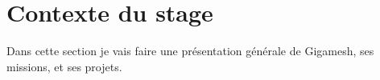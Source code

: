 
\chapter{Contexte du stage} %

\label{Chaptre1} %

Dans cette section je vais faire une présentation générale de Gigamesh, ses missions, et ses projets.


\newcommand{\keyword}[1]{\textbf{#1}}
\newcommand{\tabhead}[1]{\textbf{#1}}
\newcommand{\code}[1]{\texttt{#1}}
\newcommand{\file}[1]{\texttt{\bfseries#1}}
\newcommand{\option}[1]{\texttt{\itshape#1}}

